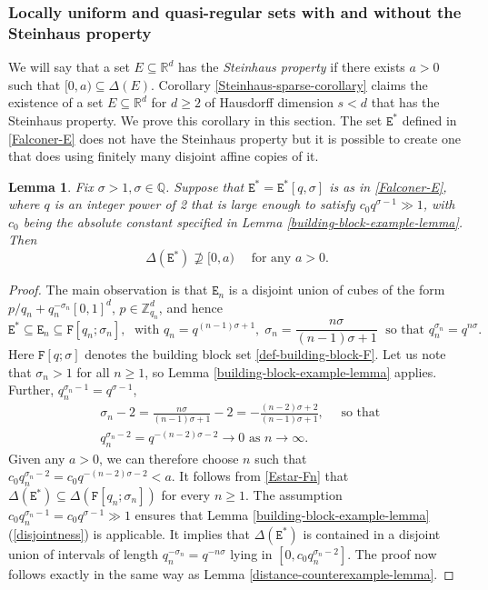 \documentclass[a4paper,11pt]{amsart}
\newtheorem{lem}[thm]{\bf Lemma}
\numberwithin{equation}{section}
\begin{document}
\subsubsection{Locally uniform and quasi-regular sets with and without the Steinhaus property} \label{Steinhaus-property-section}
\noindent We will say that a set $E \subseteq \mathbb R^d$ has the {\em{Steinhaus property}} if there exists $a > 0$ such that $[0, a) \subseteq \Delta(E)$. Corollary \ref{Steinhaus-sparse-corollary} claims the existence of a set $E \subseteq \mathbb R^d$ for $d \geq 2$ of Hausdorff dimension $s < d$ that has the Steinhaus property. We prove this corollary in this section. The set $\mathtt E^{\ast}$ defined in \eqref{Falconer-E} does not have the Steinhaus property but it is possible to create one that does using finitely many disjoint affine copies of it. 
\begin{lem} \label{Quasiregular-NoInterval-Lemma} 
Fix $\sigma > 1, \sigma \in \mathbb Q$. Suppose that $\mathtt E^{\ast} = \mathtt E^{\ast}[q, \sigma]$ is as in \eqref{Falconer-E}, where $q$ is an integer power of 2 that is large enough to satisfy $c_0 q^{\sigma-1} \gg 1$, with $c_0$ being the absolute constant specified in Lemma \ref{building-block-example-lemma}.   
Then \[ \Delta(\mathtt E^{\ast})  \not\supseteq [0, a)  \quad \text{ for any $a > 0$}. \]  
\end{lem} 
\begin{proof}
The main observation is that $\mathtt E_n$ is a disjoint union of cubes of the form $p/q_n + q_n^{-\sigma_n}[0,1]^d$, $p \in \mathbb Z_{q_n}^d$, and hence  
\begin{equation}  \label{Estar-Fn}
\mathtt E^{\ast} \subseteq \mathtt E_n \subseteq \mathtt F[q_n;\sigma_n], \; \text{ with } q_{n} = q^{(n-1)\sigma + 1}, \; \sigma_n = \frac{n \sigma}{(n-1) \sigma + 1} \; \text{ so that } q_n^{\sigma_n} = q^{n \sigma}. 
\end{equation} 
Here $\mathtt F[q; \sigma]$ denotes the building block set \eqref{def-building-block-F}. Let us note that $\sigma_n > 1$ for all $n \geq 1$, so Lemma \ref{building-block-example-lemma} applies. Further, $q_n^{\sigma_n-1} = q^{\sigma -1}$,  
  \begin{align*} 
  &\sigma_n - 2 = \frac{n \sigma}{(n-1)\sigma + 1} - 2 = -\frac{(n-2) \sigma + 2}{(n-1) \sigma + 1}, \quad\text{ so that } \\ &q_n^{\sigma_n-2} = q^{-(n-2) \sigma - 2} \longrightarrow 0 \text{ as } n \rightarrow \infty.
  \end{align*}  
Given any $a > 0$, we can therefore choose $n$ such that $c_0q_n^{\sigma_n-2} = c_0q^{-(n-2) \sigma - 2}  < a$. It follows from \eqref{Estar-Fn} that $\Delta(\mathtt E^{\ast}) \subseteq \Delta( \mathtt F[q_n;\sigma_n])$ for every $n \geq 1$. The assumption $c_0 q_n^{\sigma_n-1} = c_0 q^{\sigma-1} \gg 1$ ensures that Lemma \ref{building-block-example-lemma}(\ref{disjointness}) is applicable. It implies that $\Delta(\mathtt E^{\ast})$ is contained in a disjoint union of intervals of length $q_n^{-\sigma_n} = q^{-n \sigma}$ lying in $[0, c_0q_n^{\sigma_n-2}]$. The proof now follows exactly in the same way as Lemma \ref{distance-counterexample-lemma}.   
\end{proof} 
 
\end{document}
